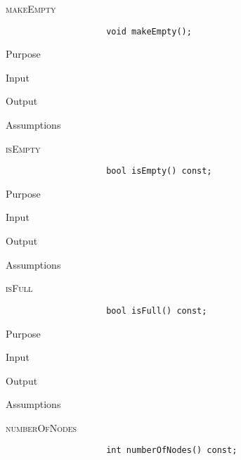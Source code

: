 \documentclass[pdftex, 12pt]{article}
\begin{document}
\begin{description}
\begin{description}
\begin{description}
			\item{\textsc{makeEmpty}}
				\begin{lstlisting}
					void makeEmpty();
				\end{lstlisting}
				\begin{description}

					\item{Purpose}

					\item{Input}

					\item{Output}

					\item{Assumptions}

				\end{description}
			\item{\textsc{isEmpty}}
				\begin{lstlisting}
					bool isEmpty() const;
				\end{lstlisting}
				\begin{description}

					\item{Purpose}

					\item{Input}

					\item{Output}

					\item{Assumptions}

				\end{description}
			\item{\textsc{isFull}}
				\begin{lstlisting}
					bool isFull() const;
				\end{lstlisting}
				\begin{description}

					\item{Purpose}

					\item{Input}

					\item{Output}

					\item{Assumptions}

				\end{description}
			\item{\textsc{numberOfNodes}}
				\begin{lstlisting}
					int numberOfNodes() const;
				\end{lstlisting}
				\begin{description}


\end{description}
\end{description}
\end{description}
\end{description}
\end{document}
